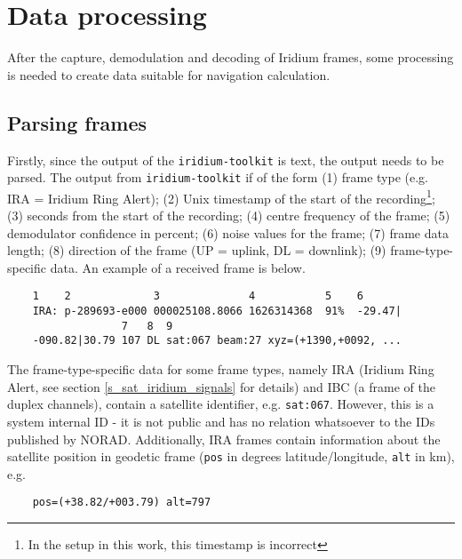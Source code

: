 \section{Data processing}
After the capture, demodulation and decoding of Iridium frames, some processing is needed to create data suitable for navigation calculation.


\subsection{Parsing frames}
Firstly, since the output of the \texttt{iridium-toolkit} is text, the output needs to be parsed. The output from \texttt{iridium-toolkit} if of the form (1) frame type (e.g. IRA = Iridium Ring Alert); (2) Unix timestamp of the start of the recording\footnote{In the setup in this work, this timestamp is incorrect}; (3) seconds from the start of the recording; (4) centre frequency of the frame; (5) demodulator confidence in percent;  (6) noise values for the frame; (7) frame data length; (8) direction of the frame (UP = uplink, DL = downlink); (9) frame-type-specific data. An example of a received frame is below.

\vspace{\parskip}
\noindent\begin{minipage}{\textwidth}
\begin{verbatim}
    1    2             3              4           5    6
    IRA: p-289693-e000 000025108.8066 1626314368  91%  -29.47|
                  7   8  9
    -090.82|30.79 107 DL sat:067 beam:27 xyz=(+1390,+0092, ...
\end{verbatim}
\end{minipage}
\vspace{\parskip}

The frame-type-specific data for some frame types, namely IRA (Iridium Ring Alert, see section \ref{s_sat_iridium_signals} for details) and IBC (a frame of the duplex channels), contain a satellite identifier, e.g. \texttt{sat:067}. However, this is a system internal ID - it is not public and has no relation whatsoever to the IDs published by NORAD. Additionally, IRA frames contain information about the satellite position in geodetic frame (\texttt{pos} in degrees latitude/longitude, \texttt{alt} in km), e.g.

\begin{verbatim}
    pos=(+38.82/+003.79) alt=797
\end{verbatim}

